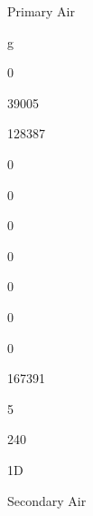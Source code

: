 \documentclass[a4paper,portrait,12pt]{article}
\begin{document}
\begin{flushleft}
Primary Air
\end{flushleft}





\begin{flushleft}
g
\end{flushleft}





0





39005





128387





0





0





0





0





0





0





0





167391





5





240





\begin{flushleft}
1D
\end{flushleft}





\begin{flushleft}
Secondary Air
\end{flushleft}
\end{document}
